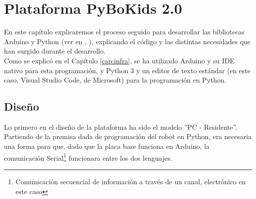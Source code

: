 \chapter{Plataforma PyBoKids 2.0}
\label{cap:PyBoKids}
En este capítulo explicaremos el proceso seguido para desarrollar las bibliotecas Arduino y Python (ver en \cite{arduinolenguaje}, \cite{PythonRef}), explicando el código y las distintas necesidades que han surgido durante el desarrollo. \\
Como se explicó en el Capítulo \ref{cap:infra}, se ha utilizado Arduino  y su IDE nativo para esta programación, y Python 3 y un editor de texto estándar (en este caso, Visual Studio Code, de Microsoft) para la programación en Python. 

\section{Diseño}\label{sec:diseño}
Lo primero en el diseño de la plataforma ha sido el modelo ''PC - Residente''. Partiendo de la premisa dada de programación del robot en Python, era necesaria una forma para que, dado que la placa base funciona en Arduino, la comunicación Serial\footnote{Comunicación secuencial de información a través de un canal, electrónico en este caso} funcionara entre los dos lenguajes. \\

